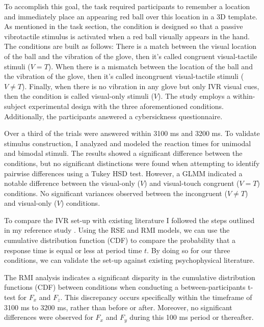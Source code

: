 \documentclass[12pt,oneside,openright]{report}
\begin{document}
To accomplish this goal, the task required participants to remember a location and immediately place an appearing red ball over this location in a 3D template. As mentioned in the task section, the condition is designed so that a passive vibrotactile stimulus is activated when a red ball visually appears in the hand. The conditions are built as follows: There is a match between the visual location of the ball and the vibration of the glove, then it's called congruent visual-tactile stimuli ($V=T$). When there is a mismatch between the location of the ball and the vibration of the glove, then it's called incongruent visual-tactile stimuli ($V \neq T$). Finally, when there is no vibration in any glove but only IVR visual cues, then the condition is called visual-only stimuli ($V$). The study employs a within-subject experimental design with the three aforementioned conditions. Additionally, the participants answered a cybersickness questionnaire.

Over a third of the trials were answered within 3100 ms and 3200 ms. To validate stimulus construction, I analyzed and modeled the reaction times for unimodal and bimodal stimuli. The results showed a significant difference between the conditions, but no significant distinctions were found when attempting to identify pairwise differences using a Tukey HSD test. However, a GLMM indicated a notable difference between the visual-only ($V$) and visual-touch congruent ($V=T$) conditions. No significant variances observed between the incongruent ($V \neq T$) and visual-only ($V$) conditions.

To compare the IVR set-up with existing literature I followed the steps outlined in my reference study \parencite{SALTAFOSSI2023108642}. Using the RSE and RMI models, we can use the cumulative distribution function (CDF) to compare the probability that a response time is equal or less at period time $t$. By doing so for our three conditions, we can validate the set-up against existing psychophysical literature.

The RMI analysis indicates a significant disparity in the cumulative distribution functions (CDF) between conditions when conducting a between-participants t-test for $F_x$ and $F_z$. This discrepancy occurs specifically within the timeframe of 3100 ms to 3200 ms, rather than before or after. Moreover, no significant differences were observed for $F_x$ and $F_y$ during this 100 ms period or thereafter.
\end{document}
